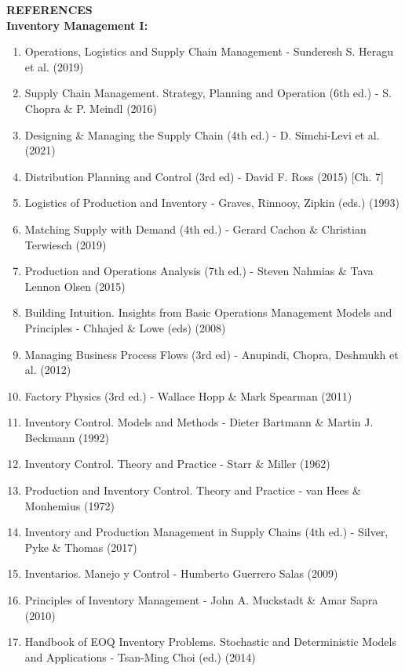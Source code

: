 \documentclass[fontsize=8pt,twoside=false,parskip=half,
headings=small,numbers=withenddot,usegeometry=true,english]{scrartcl}
\begin{document}
\newpage
\textbf{REFERENCES}\\
\textbf{Inventory Management I:}
\begin{enumerate}
	\item Operations, Logistics and Supply Chain Management - Sunderesh S. Heragu et al. (2019)
	\item Supply Chain Management. Strategy, Planning and Operation (6th ed.) - S. Chopra \& P. Meindl (2016)
	\item Designing \& Managing the Supply Chain (4th ed.) - D. Simchi-Levi et al. (2021)
	\item Distribution Planning and Control (3rd ed) - David F. Ross (2015) [Ch. 7]
	\item Logistics of Production and Inventory - Graves, Rinnooy, Zipkin (eds.) (1993)
	\item Matching Supply with Demand (4th ed.) - Gerard Cachon \& Christian Terwiesch (2019)
	\item Production and Operations Analysis (7th ed.) - Steven Nahmias \& Tava Lennon Olsen (2015)
	\item Building Intuition. Insights from Basic Operations Management Models and Principles - Chhajed \& Lowe (eds) (2008)
	\item Managing Business Process Flows (3rd ed) - Anupindi, Chopra, Deshmukh et al. (2012)
	\item Factory Physics (3rd ed.) - Wallace Hopp \& Mark Spearman (2011)
	\item Inventory Control. Models and Methods - Dieter Bartmann \& Martin J. Beckmann (1992)
	\item Inventory Control. Theory and Practice - Starr \& Miller (1962)
	\item Production and Inventory Control. Theory and Practice - van Hees \& Monhemius (1972)
	\item Inventory and Production Management in Supply Chains (4th ed.) - Silver, Pyke \& Thomas (2017)
	\item Inventarios. Manejo y Control - Humberto Guerrero Salas (2009)
	\item Principles of Inventory Management -  John A. Muckstadt \& Amar Sapra (2010)
	\item Handbook of EOQ Inventory Problems. Stochastic and Deterministic Models and Applications - Tsan-Ming Choi (ed.) (2014)
\end{enumerate}
\end{document}
